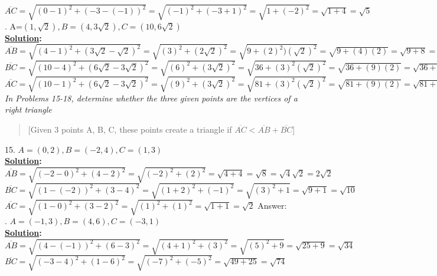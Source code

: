 \documentclass[10pt,letterpaper]{article}
\begin{document}
\newline $\overline{AC} =\sqrt{(0-1)^2+(-3-(-1))^2}=\sqrt{(-1)^2+(-3+1)^2}=\sqrt{1+(-2)^2}=\sqrt{1+4}=\sqrt{5}$
\\
. A=$(1, \sqrt{2}), B=(4, 3\sqrt{2}), C=(10, 6\sqrt{2})$\\
\textbf{\underline {Solution}:}\\
\newline $\overline{AB} =\sqrt{(4-1)^2+(3\sqrt{2}-\sqrt{2})^2}=\sqrt{(3)^2+(2\sqrt{2})^2}=\sqrt{9+(2)^2)(\sqrt{2})^2}=\sqrt{9+(4)(2)}=\sqrt{9+8}=\sqrt{17}$
\newline $\overline{BC} =\sqrt{(10-4)^2+(6\sqrt{2}-3\sqrt{2})^2}=\sqrt{(6)^2+(3\sqrt{2})^2}=\sqrt{36+(3)^2(\sqrt{2})^2}=\sqrt{36+(9)(2)}=\sqrt{36+18}=\sqrt{54}$
\newline $\overline{AC} =\sqrt{(10-1)^2+(6\sqrt{2}-3\sqrt{2})^2}=\sqrt{(9)^2+(3\sqrt{2})^2}=\sqrt{81+(3)^2(\sqrt{2})^2}=\sqrt{81+(9)(2)}=\sqrt{81+18}=\sqrt{99}=\sqrt{9}\sqrt{11}=3\sqrt{11}$
\\
\newline \textit{In Problems 15-18, determine whether the three given points are the vertices of a right triangle}
\begin{quote}
[Given 3 points A, B, C, these points create a triangle if $\overline{AC} < \overline{AB}+\overline{BC}$]
\end{quote}
15. $A=(0, 2), B=(-2, 4), C=(1, 3)$\\
\textbf{\underline {Solution}:}\\
\newline $\overline{AB} =\sqrt{(-2-0)^2+(4-2)^2}=\sqrt{(-2)^2+(2)^2}=\sqrt{4+4}=\sqrt{8}=\sqrt{4}\sqrt{2}=2\sqrt{2}$
\newline $\overline{BC} =\sqrt{(1-(-2))^2+(3-4)^2}=\sqrt{(1+2)^2+(-1)^2}=\sqrt{(3)^2+1}=\sqrt{9+1}=\sqrt{10}$
\newline $\overline{AC} =\sqrt{(1-0)^2+(3-2)^2}=\sqrt{(1)^2+(1)^2}=\sqrt{1+1}=\sqrt{2}$
\newline Answer: \color{green}{Right Triangle}\color{black}\\
. $A=(-1, 3), B=(4, 6), C=(-3, 1)$\\
\textbf{\underline {Solution}:}\\
\newline $\overline{AB} =\sqrt{(4-(-1))^2+(6-3)^2}=\sqrt{(4+1)^2+(3)^2}=\sqrt{(5)^2+9}=\sqrt{25+9}=\sqrt{34}$
\newline $\overline{BC} =\sqrt{(-3-4)^2+(1-6)^2}=\sqrt{(-7)^2+(-5)^2}=\sqrt{49+25}=\sqrt{74}$
\end{document}
